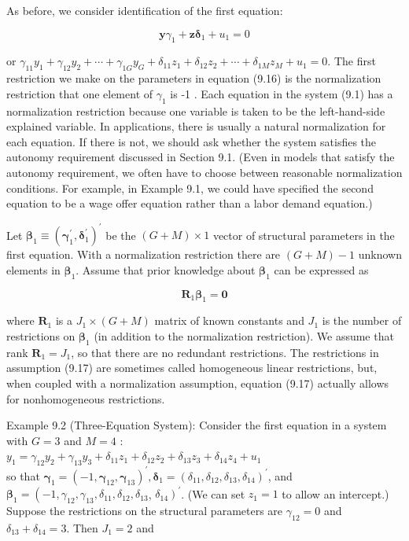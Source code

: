 \documentclass[10pt]{article}
\begin{document}
As before, we consider identification of the first equation:


\begin{equation*}
\mathbf{y} \gamma_{1}+\mathbf{z} \boldsymbol{\delta}_{1}+u_{1}=0 \tag{9.16}
\end{equation*}


or $\gamma_{11} y_{1}+\gamma_{12} y_{2}+\cdots+\gamma_{1 G} y_{G}+\delta_{11} z_{1}+\delta_{12} z_{2}+\cdots+\delta_{1 M} z_{M}+u_{1}=0$. The first restriction we make on the parameters in equation (9.16) is the normalization restriction that one element of $\gamma_{1}$ is -1 . Each equation in the system (9.1) has a normalization restriction because one variable is taken to be the left-hand-side explained variable. In applications, there is usually a natural normalization for each equation. If there is not, we should ask whether the system satisfies the autonomy requirement discussed in Section 9.1. (Even in models that satisfy the autonomy requirement, we often have to choose between reasonable normalization conditions. For example, in Example 9.1, we could have specified the second equation to be a wage offer equation rather than a labor demand equation.)

Let $\boldsymbol{\beta}_{1} \equiv\left(\boldsymbol{\gamma}_{1}^{\prime}, \boldsymbol{\delta}_{1}^{\prime}\right)^{\prime}$ be the $(G+M) \times 1$ vector of structural parameters in the first equation. With a normalization restriction there are $(G+M)-1$ unknown elements in $\boldsymbol{\beta}_{1}$. Assume that prior knowledge about $\boldsymbol{\beta}_{1}$ can be expressed as


\begin{equation*}
\mathbf{R}_{1} \boldsymbol{\beta}_{1}=\mathbf{0} \tag{9.17}
\end{equation*}


where $\mathbf{R}_{1}$ is a $J_{1} \times(G+M)$ matrix of known constants and $J_{1}$ is the number of restrictions on $\boldsymbol{\beta}_{1}$ (in addition to the normalization restriction). We assume that rank $\mathbf{R}_{1}=J_{1}$, so that there are no redundant restrictions. The restrictions in assumption (9.17) are sometimes called homogeneous linear restrictions, but, when coupled with a normalization assumption, equation (9.17) actually allows for nonhomogeneous restrictions.

Example 9.2 (Three-Equation System): Consider the first equation in a system with $G=3$ and $M=4$ :\\
$y_{1}=\gamma_{12} y_{2}+\gamma_{13} y_{3}+\delta_{11} z_{1}+\delta_{12} z_{2}+\delta_{13} z_{3}+\delta_{14} z_{4}+u_{1}$\\
so that $\boldsymbol{\gamma}_{1}=\left(-1, \boldsymbol{\gamma}_{12}, \boldsymbol{\gamma}_{13}\right)^{\prime}, \boldsymbol{\delta}_{1}=\left(\delta_{11}, \delta_{12}, \delta_{13}, \delta_{14}\right)^{\prime}$, and $\boldsymbol{\beta}_{1}=\left(-1, \gamma_{12}, \gamma_{13}, \delta_{11}, \delta_{12}, \delta_{13}\right.$, $\left.\delta_{14}\right)^{\prime}$. (We can set $z_{1}=1$ to allow an intercept.) Suppose the restrictions on the structural parameters are $\gamma_{12}=0$ and $\delta_{13}+\delta_{14}=3$. Then $J_{1}=2$ and
\end{document}
